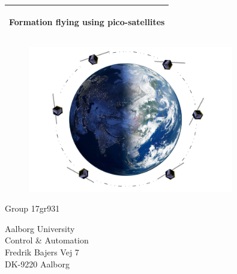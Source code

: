 %
\begin{titlepage}
  \addtolength{\hoffset}{0.5\evensidemargin-0.5\oddsidemargin} %
  \noindent%
  \begin{tabular}{@{}p{\textwidth}@{}}
    \toprule[2pt]
    \midrule
    \vspace{0.2cm}
    \begin{center}
    \Huge{\textbf{
      Formation flying using pico-satellites %
    }}
    \end{center}
%
    \vspace{0.2cm}\\
    \midrule
    \toprule[2pt]
  \end{tabular}
   \vspace{0.55 cm}
  \begin{figure}[!ht]
\centering
\includegraphics[width=0.8\textwidth]{figures/c1}
\label{fig:forside}
\end{figure}
  \vspace{0.6 cm}
  \begin{center}
    \vspace{0.2cm}
    {\Large
      Group 17gr931%
    }
  \end{center}
  \begin{center}
  Aalborg University\\
  Control \& Automation\\
  Fredrik Bajers Vej 7\\
  DK-9220 Aalborg
  \end{center}
\end{titlepage}

\clearpage
